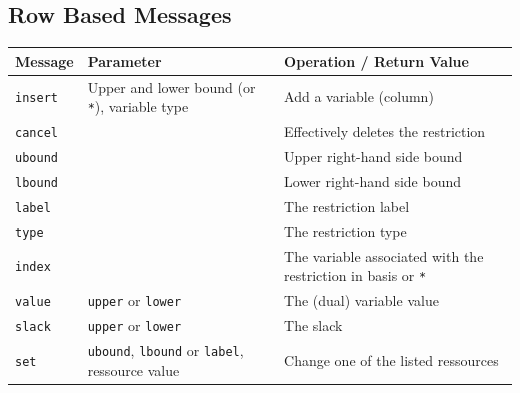 \documentclass[a4paper,11pt,twoside]{book}
\begin{document}
\subsection{Row Based Messages}
\label{slb_row_messages}
\medskip
\begin{center}
\begin{tabular}{|p{3cm}|p{9cm}|p{12.5cm}|}
\hline
{\bf Message}           & {\bf Parameter} & {\bf Operation / Return Value} \\
\hline
\hline
\verb/insert/           & Upper and lower bound (or \verb/*/), variable type
                        & Add a variable (column) \\
\hline
\verb/cancel/           & 
                        & Effectively deletes the restriction \\
\hline
\verb/ubound/           & 
                        & Upper right-hand side bound \\
\hline
\verb/lbound/           & 
                        & Lower right-hand side bound \\
\hline
\verb/label/            & 
                        & The restriction label \\
\hline
\verb/type/             & 
                        & The restriction type \\
\hline
\verb/index/            & 
                        & The variable associated with the restriction in
                          basis or \verb/*/ \\
\hline
\verb/value/            & \verb/upper/ or \verb/lower/
                        & The (dual) variable value \\
\hline
\verb/slack/            & \verb/upper/ or \verb/lower/
                        & The slack \\
\hline
\verb/set/              & \verb/ubound/, \verb/lbound/ or \verb/label/,
                          ressource value
                        & Change one of the listed ressources \\
\hline
\end{tabular}
\end{center}


\bigskip
\end{document}
